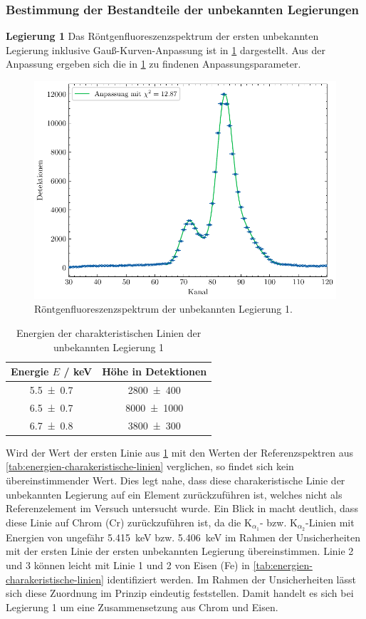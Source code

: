 \subsubsection*{Bestimmung der Bestandteile der unbekannten Legierungen}\label{subsubsec:bestandteile}
\textbf{Legierung 1}\newline
Das Röntgenfluoreszenzspektrum der ersten unbekannten Legierung inklusive Gauß-Kurven-Anpassung ist in \cref{fig:unbekannt1} dargestellt. Aus der Anpassung ergeben sich die
in \cref{tab:unbekannt1} zu findenen Anpassungsparameter.
\begin{figure}[H]
	\centering
	\includegraphics[width=0.6\linewidth]{../figs/Unbekannt1.pdf}
	\caption{Röntgenfluoreszenzspektrum der unbekannten Legierung 1.}
	\label{fig:unbekannt1}
\end{figure}
\begin{table}[H]
    \centering
    \caption{Energien der charakteristischen Linien der unbekannten Legierung 1}
    \label{tab:unbekannt1}
    \begin{tabular}{c|c}
       Energie $E$ / \unit{\kilo\electronvolt} & Höhe in Detektionen \\
\hline
\num{5.5\pm 0.7} & \num{2800\pm 400} \\ 
\num{6.5\pm 0.7} & \num{8000\pm 1000} \\ 
\num{6.7\pm 0.8} & \num{3800\pm 300} \\ 

    \end{tabular}
\end{table} Wird der Wert der ersten Linie aus \cref{tab:unbekannt1} mit den Werten der Referenzspektren aus \cref{tab:energien-charakeristische-linien} verglichen,
so findet sich kein übereinstimmender Wert. Dies legt nahe, dass diese charakeristische Linie der unbekannten Legierung auf ein Element zurückzuführen ist,
welches nicht als Referenzelement im Versuch untersucht wurde. Ein Blick in \cite{xraydata} macht deutlich, dass diese Linie auf Chrom (Cr) zurückzuführen ist,
da die $\mathrm{K}_{\alpha_1}$- bzw. $\mathrm{K}_{\alpha_2}$-Linien mit Energien von ungefähr \SI{5,415}{\kilo \electronvolt} bzw. \SI{5,406}{\kilo \electronvolt}
im Rahmen der Unsicherheiten mit der ersten Linie der ersten unbekannten Legierung übereinstimmen. Linie 2 und 3 können leicht mit Linie 1 und 2 von Eisen (Fe)
in \cref{tab:energien-charakeristische-linien} identifiziert werden. Im Rahmen der Unsicherheiten lässt sich diese Zuordnung im Prinzip eindeutig feststellen.
Damit handelt es sich bei Legierung 1 um eine Zusammensetzung aus Chrom und Eisen.\\

